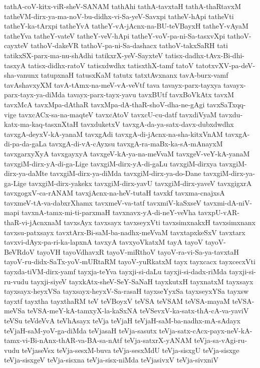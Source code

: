 {tathA-coV-kitx-viR-sheV-SANAM
tathAhi
tathA-tavxtaH
tathA-thaRtavxM
tatheVM-dirx-ya-ma-noV-bu-didhx-vi-Sa-yeV-Savxpi
tatheV-hApi
tatheVti
tatheY-ka-tArxpi
tatheYvA
tatheY-vA-jAcnx-na-BU-teVBayxH
tatheY-vAyaM
tatheYva
tatheY-vateV
tatheY-veV-hApi
tatheY-voV-pa-ni-Sa-tasxvXpi
tathoV-cayxteV
tathoV-dakeVR
tathoV-pa-ni-Sa-dashacx
tathoV-takxSaRH
tati
tatikxSX-parx-ma-nu-shAdhi
tatikxrX-yeV-SayxteV
tatisx-dadhx-tAvx-Bi-dhi-tasxyA
tatisx-didhx-ratoV
tatisxdwdhx
tatisxthX-tamf
tatoV
tatotxvXV-pa-deV-sha-vanunx
tatupxnaH
tatusxKaM
tatutx
tatxtAvxnanx
tavA-burx-vamf
tavAshavxyXM
tavA-tAmx-na-meV-vA-veVtf
tava
tavayx-parx-tayxya
tavayx-parx-tayx-ya-diMda
tavayx-parx-tayx-yavu
tavxBUtf
tavxBoVkAtx
tavxM
tavxMcA
tavxMpa-dAthaR
tavxMpa-dA-thaR-shoV-dha-ne-gAgi
tavxSaTxqq-vige
tavxcACx-sa-na-maqteV
tavxcAtoV
tavxcU-cu-datf
tavxdiVyaM
tavxdu-katx-ma-kaq-tasxnXtaH
tavxduketxV
tavxgA-da-ya-satx-davx-dubxdwdhx
tavxgA-deyxV-kA-yanaM
tavxgAdi
tavxgA-di-jAcnx-na-sha-kitxVnAM
tavxgA-di-pa-da-gaLa
tavxgA-di-vA-cAyxsu
tavxgA-ra-maBx-ka-sA-mAnayxM
tavxgarxyXyA
tavxgayxyA
tavxgeV-kA-ya-na-meVvaM
tavxgeV-veY-kA-yanaM
tavxgiM-dirx-yA-di-ga-Lige
tavxgiM-dirx-yA-di-gaLu
tavxgiM-dirxya
tavxgiM-dirx-ya-daMte
tavxgiM-dirx-ya-diMda
tavxgiM-dirx-ya-do-Dane
tavxgiM-dirx-ya-ga-Lige
tavxgiM-dirx-yakekx
tavxgiM-dirx-yavU
tavxgiM-dirx-yaveV
tavxgigxrA
tavxgogxV-ca-rANAM
tavxjAcnx-na-heV-tutaH
tavxkf
tavxma-cnajxsA
tavxmeV-tA-va-dabxrXhamx
tavxmeV-va-tatf
tavxmiV-kaSxseV
tavxmi-dA-niV-mapi
tavxnA-tamx-mi-ti-parxmaH
tavxnavx-yA-di-neY-veVha
tavxpU-vAR-thaR-vi-jAcnxnaM
tavxsAyx
tavxsayx
tavxseyxVti
tavxsimxnakxH
tavxsimxnanx
tavxsu-patxsayx
tavxtArx-Bi-saM-ba-nadhx-meVvaM
tavxtapxkeSxV
tavxtarx
tavxvi-dAyx-pa-ri-ka-lapxnA
tavxyA
tavxyoVkatxM
tayA
tayoV
tayoV-BeVRdoV
tayoVH
tayoVdhavxR
tayoV-miRthoV
tayoV-ra-vi-Sa-ya-tavxtaH
tayoV-ru-didx-SaTx-yoV-mURtaRM
tayoV-yuRkatxM
tayx
tayxcacx
tayxcecxVti
tayxda-tiVM-dirx-yamf
tayxja-teYva
tayxji-si-daLu
tayxji-si-dadx-riMda
tayxji-si-ru-vudu
tayxji-siyeV
tayxkAtx-sheV-SeY-SaNaH
tayxkutxH
tayxnatxM
tayxsayx
tayxsayx-heyxVSa
tayxsayx-heyxV-Sa-rasaH
tayxseYyxSa
tayxseyxYSa
tayxsw
tayxtf
tayxtha
tayxthaRM
teV
teVBoyxV
teVSA
teVSAM
teVSA-mayaM
teVSA-meVSa
teVSA-meY-kA-tamxyX-la-kaSxNA
teVSevxV-ka-satx-thA-cA-va-yaviV
teVSu
teVdeVvA
teVhAsayx
teVja
teVjaH
teVjaH-saM-ba-nadhx-mA-sAdayx
teVjaH-saM-yoV-ga-diMda
teVjasaH
teVja-sasutx
teVja-satx-cAcx-payx-neV-kA-tamx-vi-Bi-nAnx-thAR-va-BA-sa-nAtf
teVja-satxrX-yANAM
teVja-sa-vAgi-ru-vudu
teVjaseVsx
teVja-sesxM-buva
teVja-sesxMdU
teVja-sisxgU
teVja-sisxge
teVja-sisxgeV
teVja-sisxna
teVja-sisx-niMda
teVjasivxV
teVja-sivxniV
}
